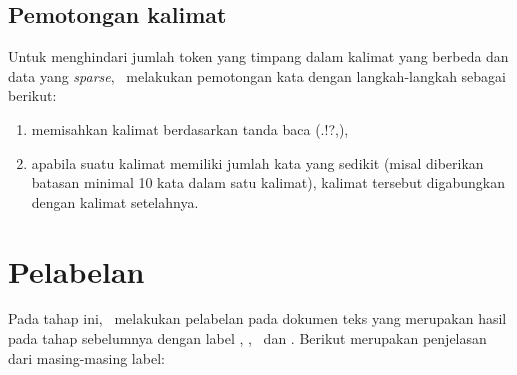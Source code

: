 \subsection{Pemotongan kalimat}
Untuk menghindari jumlah token yang timpang dalam kalimat yang berbeda dan data yang \textit{sparse}, \saya~melakukan pemotongan kata dengan langkah-langkah sebagai berikut:
\begin{enumerate}
	\item memisahkan kalimat berdasarkan tanda baca (.!?,),
	\item apabila suatu kalimat memiliki jumlah kata yang sedikit (misal diberikan batasan minimal 10 kata dalam satu kalimat), kalimat tersebut digabungkan dengan kalimat setelahnya.
\end{enumerate}

\section{Pelabelan}
Pada tahap ini, \saya~melakukan pelabelan pada dokumen teks yang merupakan hasil pada tahap sebelumnya dengan label \disease, \symptom, \drug~dan \treatment. Berikut merupakan penjelasan dari masing-masing label:
